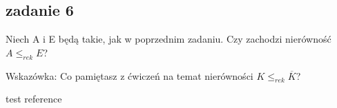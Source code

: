 \documentclass[svgnames]{report}
\begin{document}
\subsection{zadanie 6}
\begin{framed}
Niech A i E będą takie, jak w poprzednim zadaniu. Czy zachodzi nierówność $A \leqslant_{rek} E$?

Wskazówka: Co pamiętasz z ćwiczeń na temat nierówności  $K \leqslant_{rek} \overline{K}$?
\end{framed}

\begin{thebibliography}{99}
 test reference
\end{thebibliography}
\end{document}
